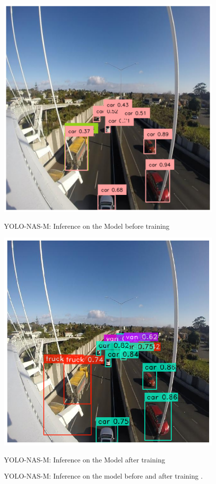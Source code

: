 \begin{figure}[H]
  \begin{minipage}{0.48\textwidth}
    \centering
    \includegraphics[width=\linewidth]{tex/img/M-before_training.png}
    \caption{YOLO-NAS-M: Inference 
    on the Model before training}
    \label{fig:YOLO-NASSM_vs_other_models}
  \end{minipage}%
  \begin{minipage}{0.5\textwidth}
    \centering
    \includegraphics[width=\linewidth]{tex/img/M-after training.png}
    \caption{YOLO-NAS-M: Inference on the Model after training}
    \label{fig:YOLO-NAS_vs_other_models}
  \end{minipage}
  \caption{YOLO-NAS-M: Inference on the model before and  after training .}
\end{figure}

